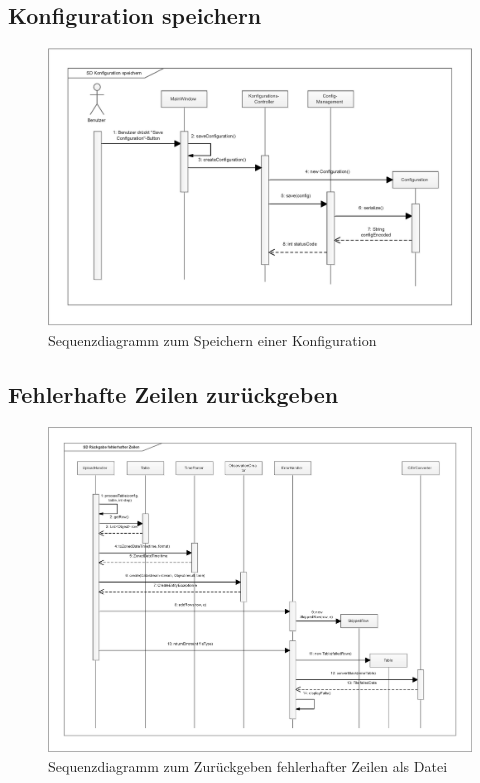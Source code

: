 \subsection{Konfiguration speichern}
\begin{figure}[htbp]
\centering
\includegraphics[scale=0.44]{uml/SD_saveConfig.eps}
\caption{Sequenzdiagramm zum Speichern einer Konfiguration}
\end{figure}

\clearpage
\subsection{Fehlerhafte Zeilen zurückgeben}
\begin{figure}[htbp]
\centering
\includegraphics[scale=0.44]{uml/SD_returnErrors.eps}
\caption{Sequenzdiagramm zum Zurückgeben fehlerhafter Zeilen als Datei}
\end{figure}


